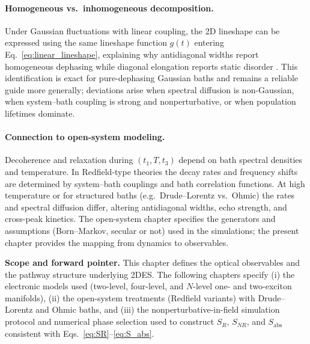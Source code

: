 \paragraph{Homogeneous vs.\ inhomogeneous decomposition.}
Under Gaussian fluctuations with linear coupling, the 2D lineshape can be expressed using the same lineshape function $g(t)$ entering Eq.~\eqref{eq:linear_lineshape}, explaining why antidiagonal widths report homogeneous dephasing while diagonal elongation reports static disorder \cite{mukamel1995principlesnonlinearoptical, hamm2005principlesnonlinearoptical}. This identification is exact for pure-dephasing Gaussian baths and remains a reliable guide more generally; deviations arise when spectral diffusion is non-Gaussian, when system--bath coupling is strong and nonperturbative, or when population lifetimes dominate.

\paragraph{Connection to open-system modeling.}
Decoherence and relaxation during $(t_1,T,t_3)$ depend on bath spectral densities and temperature. In Redfield-type theories the decay rates and frequency shifts are determined by system--bath couplings and bath correlation functions. At high temperature or for structured baths (e.g.\ Drude--Lorentz vs.\ Ohmic) the rates and spectral diffusion differ, altering antidiagonal widths, echo strength, and cross-peak kinetics. The open-system chapter specifies the generators and assumptions (Born--Markov, secular or not) used in the simulations; the present chapter provides the mapping from dynamics to observables.

\bigskip
\noindent\textbf{Scope and forward pointer.}
This chapter defines the optical observables and the pathway structure underlying 2DES. The following chapters specify (i) the electronic models used (two-level, four-level, and $N$-level one- and two-exciton manifolds), (ii) the open-system treatments (Redfield variants) with Drude--Lorentz and Ohmic baths, and (iii) the nonperturbative-in-field simulation protocol and numerical phase selection used to construct $S_R$, $S_{NR}$, and $S_{\mathrm{abs}}$ consistent with Eqs.~\eqref{eq:SR}--\eqref{eq:S_abs}.
